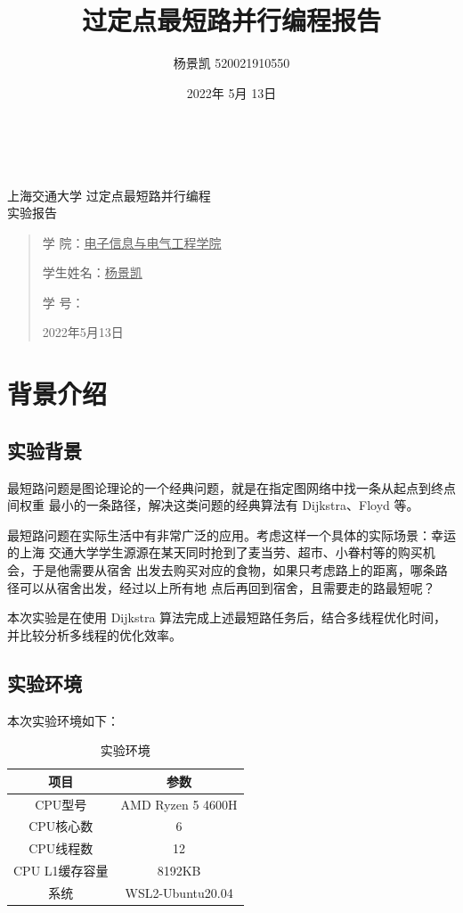 \documentclass[UTF8]{ctexart}
\title{过定点最短路并行编程报告}
\author{杨景凯 520021910550}
\date{2022年 5月 13日}
\begin{document}
\begin{center}
    \quad \\
    \quad \\
    \kaishu \fontsize{45}{17} 上\quad 海\quad 交\quad 通\quad 大\quad 学
    \vskip 3.5cm
    \heiti {} 过定点最短路并行编程\\
    实验报告
\end{center}
\vskip 3.5cm
\begin{quotation}
    \songti \fontsize{30}{30}
    \doublespacing
    \par\setlength\parindent{12em}
    \quad 
\begin{center}
    学\hspace{0.61cm} 院：\underline{电子信息与电气工程学院}

    学生姓名：\underline{\qquad    \quad \quad 杨景凯    \quad  \quad\qquad }

    学\hspace{0.61cm} 号：\underline{\quad \quad{}\quad\quad}
\end{center}
    \centering
    2022年5月13日
\end{quotation}

\clearpage
\tableofcontents

\clearpage
\section{背景介绍}
\subsection{实验背景}
最短路问题是图论理论的一个经典问题，就是在指定图网络中找一条从起点到终点间权重
最小的一条路径，解决这类问题的经典算法有 Dijkstra、Floyd 等。

最短路问题在实际生活中有非常广泛的应用。考虑这样一个具体的实际场景：幸运的上海
交通大学学生源源在某天同时抢到了麦当劳、超市、小眷村等的购买机会，于是他需要从宿舍
出发去购买对应的食物，如果只考虑路上的距离，哪条路径可以从宿舍出发，经过以上所有地
点后再回到宿舍，且需要走的路最短呢？\cite{refpdf1}

本次实验是在使用 Dijkstra 算法完成上述最短路任务后，结合多线程优化时间，并比较分析多线程的优化效率。

\subsection{实验环境}
本次实验环境如下：
\begin{table}[H]
    \centering
    \begin{tabular}{|c|c|}
        \hline
        项目 & 参数\\
        \hline
        CPU型号 & AMD Ryzen 5 4600H\\
        \hline
        CPU核心数 & 6\\
        \hline
        CPU线程数 & 12\\
        \hline
        CPU L1缓存容量 & 8192KB\\
        \hline
        系统 & WSL2-Ubuntu20.04\\
        \hline
    \end{tabular}
    \caption{实验环境}
\end{table}
\end{document}
